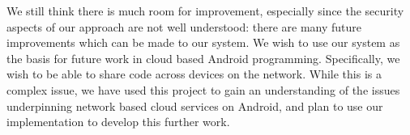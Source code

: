 \documentclass{acm_proc_article-sp}
\begin{document}
We still think there is much room for improvement, especially since
the security aspects of our approach are not well understood: there
are many future improvements which can be made to our system.  We wish
to use our system as the basis for future work in cloud based Android
programming.  Specifically, we wish to be able to share code across
devices on the network.  While this is a complex issue, we have used
this project to gain an understanding of the issues underpinning
network based cloud services on Android, and plan to use our
implementation to develop this further work.

{}

\end{document}
